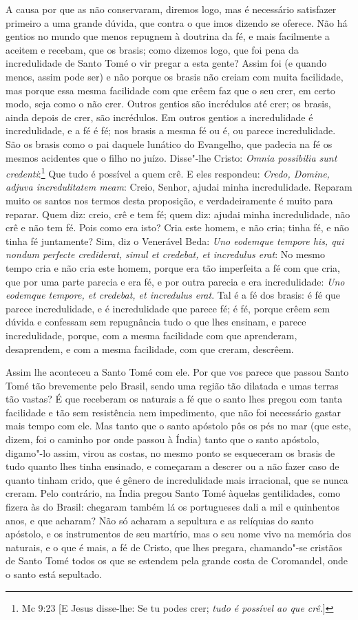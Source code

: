 A causa por que as não conservaram, diremos logo, mas é necessário
satisfazer primeiro a uma grande dúvida, que contra o que imos dizendo
se oferece. Não há gentios no mundo que menos repugnem à doutrina da fé,
e mais facilmente a aceitem e recebam, que os brasis; como dizemos logo,
que foi pena da incredulidade de Santo Tomé o vir pregar a esta gente?
Assim foi (e quando menos, assim pode ser) e não porque os brasis
não creiam com muita facilidade, mas porque essa mesma facilidade com
que crêem faz que o seu crer, em certo modo, seja como o não crer.
Outros gentios são incrédulos até crer; os brasis, ainda depois de crer,
são incrédulos. Em outros gentios a incredulidade é incredulidade, e a
fé é fé; nos brasis a mesma fé ou é, ou parece incredulidade. São os
brasis como o pai daquele lunático do Evangelho, que padecia na fé os
mesmos acidentes que o filho no juízo. Disse"-lhe Cristo: \emph{Omnia
possibilia sunt credenti}:\footnote{Mc 9:23 [E Jesus disse-lhe: Se tu podes crer; \emph{tudo é possível ao que crê}.]} Que tudo é possível a quem crê.
E eles respondeu: \emph{Credo, Domine, adjuva incredulitatem meam}:
Creio, Senhor, ajudai minha incredulidade.
Reparam muito os santos nos termos desta proposição, e
verdadeiramente é muito para reparar. Quem diz: creio, crê e tem fé;
quem diz: ajudai minha incredulidade, não crê e não tem fé. Pois como
era isto? Cria este homem, e não cria; tinha fé, e não tinha fé
juntamente? Sim, diz o Venerável Beda: \emph{Uno eodemque tempore his,
qui nondum perfecte crediderat, simul et credebat, et incredulus erat}:
No mesmo tempo cria e não cria este homem, porque era tão imperfeita a
fé com que cria, que por uma parte parecia e era fé, e por outra parecia
e era incredulidade: \emph{Uno eodemque tempore, et credebat, et
incredulus erat}. Tal é a fé dos brasis: é fé que parece incredulidade,
e é incredulidade que parece fé; é fé, porque crêem sem dúvida e
confessam sem repugnância tudo o que lhes ensinam, e parece
incredulidade, porque, com a mesma facilidade com que aprenderam,
desaprendem, e com a mesma facilidade, com que creram, descrêem.


Assim lhe aconteceu a Santo Tomé com ele. Por que vos parece que passou
Santo Tomé tão brevemente pelo Brasil, sendo uma região tão dilatada e
umas terras tão vastas? É que receberam os naturais a fé que o santo lhes
pregou com tanta facilidade e tão sem resistência nem impedimento, que
não foi necessário gastar mais tempo com ele. Mas tanto que o santo
apóstolo pôs os pés no mar (que este, dizem, foi o caminho por onde
passou à Índia) tanto que o santo apóstolo, digamo"-lo assim,
virou as costas, no mesmo ponto se esqueceram os brasis de tudo quanto
lhes tinha ensinado, e começaram a descrer ou a não fazer caso de quanto
tinham crido, que é gênero de incredulidade mais irracional, que se
nunca creram. Pelo contrário, na Índia pregou Santo Tomé àquelas
gentilidades, como fizera às do Brasil: chegaram também lá os
portugueses dali a mil e quinhentos anos, e que acharam? Não só acharam
a sepultura e as relíquias do santo apóstolo, e os instrumentos de seu
martírio, mas o seu nome vivo na memória dos naturais, e o que é mais, a
fé de Cristo, que lhes pregara, chamando"-se cristãos de Santo Tomé todos
os que se estendem pela grande costa de Coromandel, onde o santo está
sepultado.

